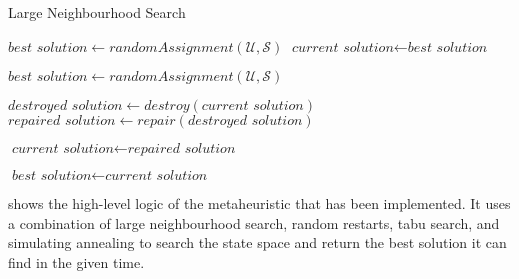 \begin{algorithm}[H]
\caption{Large Neighbourhood Search}\label{metaheuristic}
\begin{algorithmic}[1]
        \State $\textit{best solution} \gets \textit{randomAssignment}(\mathcal{U}, \mathcal{S})$
        \State $\textit{current solution} \gets \textit{best solution}$
        
                \State $\textit{best solution} \gets \textit{randomAssignment}(\mathcal{U}, \mathcal{S})$
            \EndIf
            
            \State $\textit{destroyed solution} \gets \textit{destroy}(\textit{current solution})$
            \State $\textit{repaired solution} \gets \textit{repair}(\textit{destroyed solution})$
            
                \State $\textit{current solution} \gets \textit{repaired solution}$
                
                    \State $\textit{best solution} \gets \textit{current solution}$
                \EndIf
            \EndIf
        \EndWhile
        
        \State {}
    \EndProcedure
\end{algorithmic}
\end{algorithm}

 shows the high-level logic of the metaheuristic that has been implemented. It uses a combination of large neighbourhood search, random restarts, tabu search, and simulating annealing to search the state space and return the best solution it can find in the given time.

